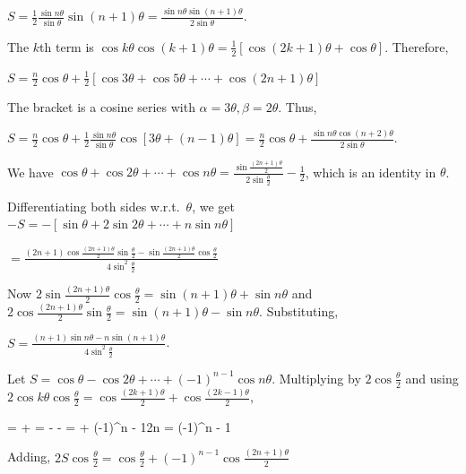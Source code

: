   $S = \frac{1}{2}\frac{\sin n\theta}{\sin\theta}\sin(n + 1)\theta = \frac{\sin n\theta\sin(n +
    1)\theta}{2\sin\theta}$.
\item The $k$th term is $\cos k\theta\cos(k + 1)\theta = \frac{1}{2}[\cos(2k + 1)\theta + \cos\theta]$.
  Therefore,

  $S = \frac{n}{2}\cos\theta + \frac{1}{2}[\cos3\theta + \cos5\theta + \cdots + \cos(2n + 1)\theta]$

  The bracket is a cosine series with $\alpha = 3\theta, \beta = 2\theta$. Thus,

  $S = \frac{n}{2}\cos\theta + \frac{1}{2}\frac{\sin n\theta}{\sin\theta}\cos[3\theta + (n - 1)\theta] =
  \frac{n}{2}\cos\theta + \frac{\sin n\theta\cos(n + 2)\theta}{2\sin\theta}$.
\item We have $\cos\theta + \cos2\theta + \cdots + \cos n\theta = \frac{\sin\frac{(2n +
      1)\theta}{2}}{2\sin\frac{\theta}{2}} - \frac{1}{2}$, which is an identity in $\theta$.

  Differentiating both sides w.r.t.\ $\theta$, we get $-S = -[\sin\theta + 2\sin2\theta + \cdots + n\sin
  n\theta]$

  $= \frac{(2n + 1)\cos\frac{(2n + 1)\theta}{2}\sin\frac{\theta}{2} - \sin\frac{(2n +
      1)\theta}{2}\cos\frac{\theta}{2}}{4\sin^2\frac{\theta}{2}}$

  Now $2\sin\frac{(2n + 1)\theta}{2}\cos\frac{\theta}{2} = \sin(n + 1)\theta + \sin n\theta$ and $2\cos\frac{(2n
    + 1)\theta}{2}\sin\frac{\theta}{2} = \sin(n + 1)\theta - \sin n\theta$. Substituting,

  $S = \frac{(n + 1)\sin n\theta - n\sin(n + 1)\theta}{4\sin^2\frac{\theta}{2}}$.
\item Let $S = \cos\theta - \cos2\theta + \cdots + (-1)^{n - 1}\cos n\theta$. Multiplying by
  $2\cos\frac{\theta}{2}$ and using $2\cos k\theta\cos\frac{\theta}{2} = \cos\frac{(2k + 1)\theta}{2} +
  \cos\frac{(2k - 1)\theta}{2}$,

  \startformula\startalign
    \cos\theta\cos{} \NC = \cos{} + \cos{}\NR
    \theta\cos{} \NC = -\cos{} - \cos{}\NR
    \theta\cos{} \NC = \cos{} + \cos{}\NR
    \NC \NC \cdots\NR
    \NC (-1)^{n - 1}2\cos n\theta\cos{} \NC = (-1)^{n - 1}\NR
  \stopalign\stopformula

  Adding, $2S\cos\frac{\theta}{2} = \cos\frac{\theta}{2} + (-1)^{n - 1}\cos\frac{(2n + 1)\theta}{2}$

